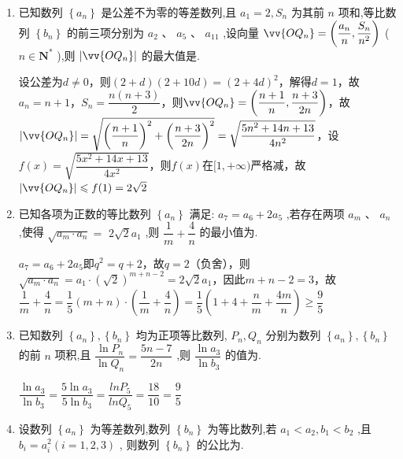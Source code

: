 \begin{enumerate}
\begin{jieda}
\begin{dingautolist}{172}
        \end{dingautolist}
    \end{jieda}
    \item 已知数列 $\left\{  {a}_{n}\right\}$ 是公差不为零的等差数列,且 ${a}_{1} = 2,{S}_{n}$ 为其前 $n$ 项和,等比数列 $\left\{  {b}_{n}\right\}$ 的前三项分别为 ${a}_{2}$ 、 ${a}_{5}$ 、 ${a}_{11}$ ,设向量 $\vv{O{Q}_{n}} = \left( {\dfrac{{a}_{n}}{n},\dfrac{{S}_{n}}{{n}^{2}}}\right)$ ( $n \in  {\mathbf{N}}^{ * }$ ),则 $\left| \vv{O{Q}_{n}}\right|$ 的最大值是.
    \begin{jieda}
        设公差为$d \neq 0$，则$(2+d)(2+10d) = (2+4d)^2$，解得$d = 1$，故$a_n = n+1$，$S_n = \dfrac{n(n+3)}{2}$，则$\vv{O{Q}_{n}} = \left( {\dfrac{n+1}{n},\dfrac{n+3}{2n}}\right)$，故$\left| \vv{O{Q}_{n}}\right| = \sqrt{\left(\dfrac{n+1}{n}\right)^2 + \left(\dfrac{n+3}{2n}\right)^2} = \sqrt{\dfrac{5n^2+14n+13}{4n^2}}$，设$f(x) = \sqrt{\dfrac{5x^2+14x+13}{4x^2}}$，则$f(x)$在$[1, +\infty)$严格减，故$\left| \vv{O{Q}_{n}}\right| \leq f(1) = 2\sqrt{2}$
    \end{jieda}
    \item 已知各项为正数的等比数列 $\left\{  {a}_{n}\right\}$ 满足: ${a}_{7} = {a}_{6} + 2{a}_{5}$ ,若存在两项 ${a}_{m}\text{ 、 }{a}_{n}$ ,使得 $\sqrt{{a}_{m} \cdot  {a}_{n}} =$  $2\sqrt{2}{a}_{1}$ ,则 $\dfrac{1}{m} + \dfrac{4}{n}$ 的最小值为.
    \begin{jieda}
        ${a}_{7} = {a}_{6} + 2{a}_{5}$即$q^2 = q + 2$，故$q = 2$（负舍），则$\sqrt{a_m \cdot a_n} = a_1 \cdot (\sqrt{2})^{m+n-2} = 2\sqrt{2}a_1$，因此$m+n-2 = 3$，故$\dfrac{1}{m} + \dfrac{4}{n} = \dfrac{1}{5}(m+n) \cdot \left(\dfrac{1}{m} + \dfrac{4}{n}\right) = \dfrac{1}{5}\left(1+4+\dfrac{n}{m}+\dfrac{4m}{n}\right) \geq \dfrac{9}{5}$
    \end{jieda}
    \item 已知数列 $\left\{  {a}_{n}\right\}  ,\left\{  {b}_{n}\right\}$ 均为正项等比数列, ${P}_{n},{Q}_{n}$ 分别为数列 $\left\{  {a}_{n}\right\}  ,\left\{  {b}_{n}\right\}$ 的前 $n$ 项积,且 $\dfrac{\ln {P}_{n}}{\ln {Q}_{n}} = \dfrac{{5n} - 7}{2n}$ ,则 $\dfrac{\ln {a}_{3}}{\ln {b}_{3}}$ 的值为.
    \begin{jieda}
        $\dfrac{\ln {a}_{3}}{\ln {b}_{3}} = \dfrac{5\ln {a}_{3}}{5\ln {b}_{3}} = \dfrac{lnP_5}{ln Q_5} = \dfrac{18}{10} = \dfrac{9}{5}$
    \end{jieda}
    \item 设数列 $\left\{  {a}_{n}\right\}$ 为等差数列,数列 $\left\{  {b}_{n}\right\}$ 为等比数列,若 ${a}_{1} < {a}_{2},{b}_{1} < {b}_{2}$ ,且 ${b}_{i} = {a}_{i}^{2}\left( {i = 1,2,3}\right)$ , 则数列 $\left\{  {b}_{n}\right\}$ 的公比为.

\end{enumerate}
